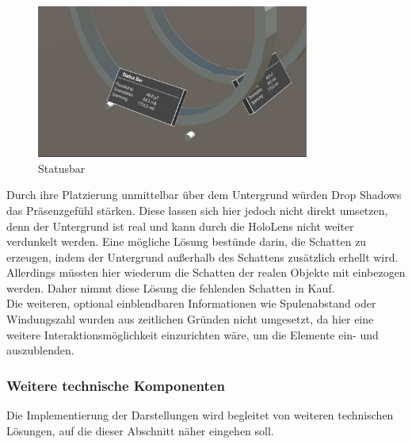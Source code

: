 \begin{figure}[H]
	\centering
	\includegraphics[width=0.8\textwidth]{images/status.jpg}
	\caption{Statusbar}
	\label{img:status}
\end{figure}

Durch ihre Platzierung unmittelbar über dem Untergrund würden Drop Shadows das Präsenzgefühl stärken. Diese lassen sich hier jedoch nicht direkt umsetzen, denn der Untergrund ist real und kann durch die HoloLens nicht weiter verdunkelt werden. Eine mögliche Lösung bestünde darin, die Schatten zu erzeugen, indem der Untergrund außerhalb des Schattens zusätzlich erhellt wird. Allerdings müssten hier wiederum die Schatten der realen Objekte mit einbezogen werden. Daher nimmt diese Lösung die fehlenden Schatten in Kauf.\\

Die weiteren, optional einblendbaren Informationen wie Spulenabstand oder Windungszahl wurden aus zeitlichen Gründen nicht umgesetzt, da hier eine weitere Interaktionsmöglichkeit einzurichten wäre, um die Elemente ein- und auszublenden.

\subsubsection{Weitere technische Komponenten}
\label{sec-5-2-4}
Die Implementierung der Darstellungen wird begleitet von weiteren technischen Lösungen, auf die dieser Abschnitt näher eingehen soll.
\vspace{8px}
\begin{center}
	\\
\end{center}
\vspace{6px}

